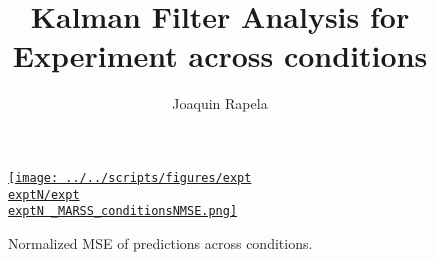 \documentclass[12 pt]{article}  %
\title{Kalman Filter Analysis for Experiment {\exptN} across conditions}
\author{Joaquin Rapela}
\begin{document}
\maketitle

\listoffigures

\begin{figure}
    \begin{center}
            \href{http://www.gatsby.ucl.ac.uk/~rapela/sepi/reports/kfAnalysis/figures/expt\exptN/expt\exptN _MARSS_conditionsNMSE.html}{\texttt{[image: ../../scripts/figures/expt\\exptN/expt\\exptN \_MARSS\_conditionsNMSE.png]}}
            \caption{Normalized MSE of predictions across conditions.}
        \label{fig:nmses}
    \end{center}
\end{figure}
\end{document}
